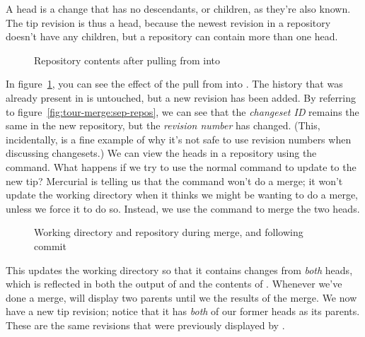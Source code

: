 A head is a change that has no descendants, or children, as they're
also known.  The tip revision is thus a head, because the newest
revision in a repository doesn't have any children, but a repository
can contain more than one head.

\begin{figure}[ht]
  \centering
  \caption{Repository contents after pulling from  into
    }
  \label{fig:tour-merge:pull}
\end{figure}

In figure~\ref{fig:tour-merge:pull}, you can see the effect of the
pull from  into .  The history
that was already present in  is untouched, but a
new revision has been added.  By referring to
figure~\ref{fig:tour-merge:sep-repos}, we can see that the
\emph{changeset ID} remains the same in the new repository, but the
\emph{revision number} has changed.  (This, incidentally, is a fine
example of why it's not safe to use revision numbers when discussing
changesets.)  We can view the heads in a repository using the
 command.
What happens if we try to use the normal  command to
update to the new tip?
Mercurial is telling us that the  command won't do a
merge; it won't update the working directory when it thinks we might
be wanting to do a merge, unless we force it to do so.  Instead, we
use the  command to merge the two heads.

\begin{figure}[ht]
  \centering
  \caption{Working directory and repository during merge, and
    following commit}
  \label{fig:tour-merge:merge}
\end{figure}

This updates the working directory so that it contains changes from
\emph{both} heads, which is reflected in both the output of
 and the contents of .
Whenever we've done a merge,  will display two parents
until we  the results of the merge.
We now have a new tip revision; notice that it has \emph{both} of
our former heads as its parents.  These are the same revisions that
were previously displayed by .

